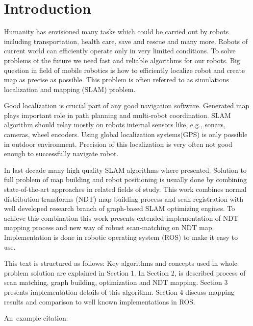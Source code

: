 \chapter*{Introduction}
Humanity has envisioned many tasks which could be carried out by robots including transportation, health care, save and rescue and many more. Robots of current world can efficiently operate only in very limited conditions. To solve problems of the future we need fast and reliable algorithms for our robots. Big question in field of mobile robotics is how to efficiently localize robot and create map as precise as possible. This problem is often referred to as simulations localization and mapping (SLAM) problem.

Good localization is crucial part of any good navigation software. Generated map plays important role in path planning and  multi-robot coordination. SLAM algorithm should relay mostly on robots internal sensors like, e.g., sonars, cameras, wheel encoders. Using global localization systems(GPS) is only possible in outdoor environment. Precision of this localization is very often not good enough to successfully navigate robot.

In last decade many high quality SLAM algorithms where presented. Solution to full problem of map building and robot positioning is usually done by combining state-of-the-art approaches in related fields of study. This work combines normal distribution transforms (NDT) map building process and scan registration with well developed research branch of graph-based SLAM optimizing engines. To achieve this combination this work presents extended implementation of NDT mapping process and new way of robust scan-matching on NDT map. Implementation is done in robotic operating system (ROS) to make it easy to use.

This text is structured as follows: Key algorithms and concepts used in whole problem solution are explained in Section 1. In Section 2, is described process of scan matching, graph building, optimization and NDT mapping. Section 3 presents implementation details of this algorithm. Section 4 discuss mapping results and comparison to well known implementations in ROS.  

An~example citation: \cite{Andel07}

